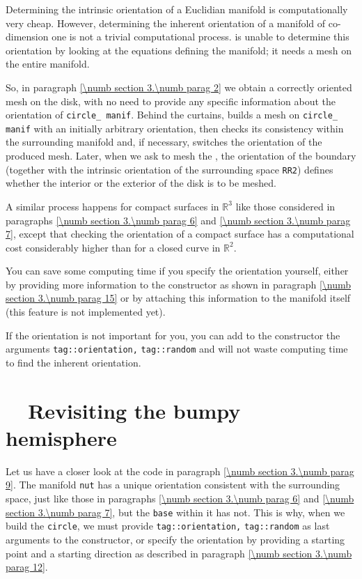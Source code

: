 Determining the intrinsic orientation of a Euclidian manifold is computationally
very cheap.
However, determining the inherent orientation of a manifold of co-dimension one is not
a trivial computational process.
{\ManiFEM} is unable to determine this orientation by looking at the equations defining
the manifold; it needs a mesh on the entire manifold.

So, in paragraph \ref{\numb section 3.\numb parag 2} we obtain a correctly oriented mesh
on the disk, with no need to provide any specific information about the orientation of
{\small\tt circle\_\,manif}.
Behind the curtains, {\maniFEM} builds a mesh on {\small\tt circle\_\,manif} with
an initially arbitrary orientation, then checks its consistency
within the surrounding manifold and, if necessary, switches the orientation of the produced mesh.
Later, when we ask {\maniFEM} to mesh the {\small\tt{}}, the orientation of the boundary
(together with the intrinsic orientation of the surrounding space {\small\tt RR2})
defines whether the interior or the exterior of the disk is to be meshed.

A similar process happens for compact surfaces in $ \mathbb{R}^3 $ like those
considered in paragraphs \ref{\numb section 3.\numb parag 6} and
\ref{\numb section 3.\numb parag 7},
except that checking the orientation of a compact surface has a computational cost
considerably higher than for a closed curve in $ \mathbb{R}^2 $.

You can save some computing time if you specify the orientation
yourself, either by providing more information to the {\small\tt{}} constructor as shown
in paragraph \ref{\numb section 3.\numb parag 15} or by attaching this information to
the manifold itself (this feature is not implemented yet).
 
If the orientation is not important for you, you can add to the {\small\tt{}} constructor
the arguments {\small\tt\textcolor{tag}{tag}::orientation,}
{\small\tt\textcolor{tag}{tag}::random} and {\maniFEM} will not waste
computing time to find the inherent orientation.

\section{~~Revisiting the bumpy hemisphere}\label{\numb section 3.\numb parag 14}

Let us have a closer look at the code in paragraph \ref{\numb section 3.\numb parag 9}.
The manifold {\small\tt nut} has a unique orientation consistent with the surrounding
space, just like those in paragraphs \ref{\numb section 3.\numb parag 6} and
\ref{\numb section 3.\numb parag 7}, but the {\small\tt base} within it has not.
This is why, when we build the {\small\tt circle}, we must provide
{\small\tt\textcolor{tag}{tag}::orientation,} {\small\tt\textcolor{tag}{tag}::random}
as last arguments to the {\small\tt{}} constructor,
or specify the orientation by providing a starting point and a starting direction
as described in paragraph \ref{\numb section 3.\numb parag 12}.

